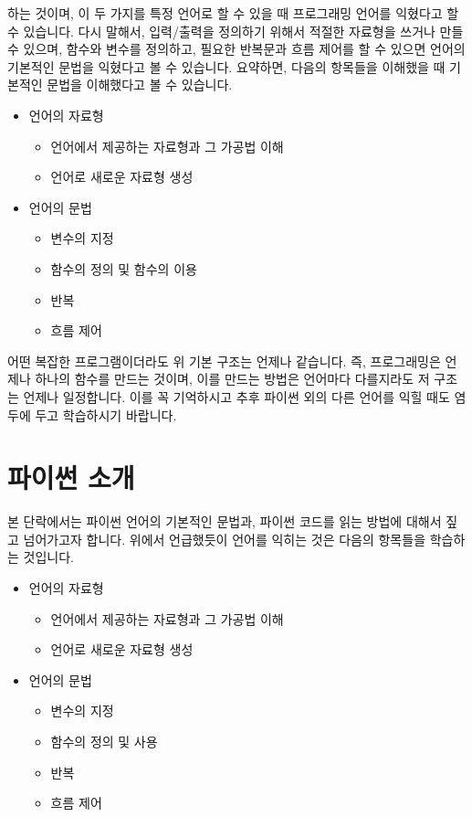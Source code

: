 \documentclass[twoside]{article}
\begin{document}
하는 것이며, 이 두 가지를 특정 언어로 할 수 있을 때 프로그래밍 언어를 익혔다고 할 수 있습니다. 다시 말해서, 입력/출력을 정의하기 위해서 적절한 자료형을 쓰거나 만들 수 있으며, 함수와 변수를 정의하고, 필요한 반복문과 흐름 제어를 할 수 있으면 언어의 기본적인 문법을 익혔다고 볼 수 있습니다. 요약하면, 다음의 항목들을 이해했을 때 기본적인 문법을 이해했다고 볼 수 있습니다. 


\begin{itemize} 
\item 언어의 자료형 
\begin{itemize}
\item 언어에서 제공하는 자료형과 그 가공법 이해 
\item 언어로 새로운 자료형 생성
\end{itemize} 
\item 언어의 문법 
\begin{itemize} 
\item 변수의 지정 
\item 함수의 정의 및 함수의 이용 
\item 반복 
\item 흐름 제어
\end{itemize}
\end{itemize}
 어떤 복잡한 프로그램이더라도 위 기본 구조는 언제나 같습니다. 즉, 프로그래밍은 언제나 하나의 함수를 만드는 것이며, 이를 만드는 방법은 언어마다 다를지라도 저 구조는 언제나 일정합니다. 이를 꼭 기억하시고 추후 파이썬 외의 다른 언어를 익힐 때도 염두에 두고 학습하시기 바랍니다. 


\section{파이썬 소개} 





본 단락에서는 파이썬 언어의 기본적인 문법과, 파이썬 코드를 읽는 방법에 대해서 짚고 넘어가고자 합니다. 위에서 언급했듯이 언어를 익히는 것은 다음의 항목들을 학습하는 것입니다. 

\begin{itemize} 
\item 언어의 자료형 
\begin{itemize}
\item 언어에서 제공하는 자료형과 그 가공법 이해 
\item 언어로 새로운 자료형 생성
\end{itemize} 
\item 언어의 문법 
\begin{itemize} 
\item 변수의 지정 
\item 함수의 정의 및 사용 
\item 반복 
\item 흐름 제어
\end{itemize}
\end{itemize}
\end{document}
